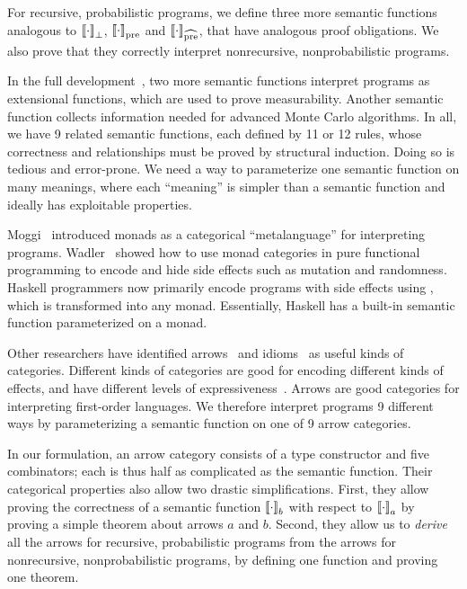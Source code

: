 \documentclass{llncs}
\newcommand{\todo}[1]{}
\newcommand{\gen}{_a}
\newcommand{\genb}{_b}
\newcommand{\pre}{_\mathrm{pre}}
\newcommand{\prehat}{_\mathrm{\widehat{pre}}}
\begin{document}
For recursive, probabilistic programs, we define three more semantic functions analogous to $\left\llbracket{\cdot}\right\rrbracket_\bot$, $\meaningof{\cdot}\pre$ and $\meaningof{\cdot}\prehat$, that have analogous proof obligations.
We also prove that they correctly interpret nonrecursive, nonprobabilistic programs.

In the full development~\cite{cit:toronto-thesis}, two more semantic functions interpret programs as extensional functions, which are used to prove measurability.
Another semantic function collects information needed for advanced Monte Carlo algorithms.
In all, we have 9 related semantic functions, each defined by 11 or 12 rules, whose correctness and relationships must be proved by structural induction.
Doing so is tedious and error-prone.
We need a way to parameterize one semantic function on many meanings, where each ``meaning'' is simpler than a semantic function and ideally has exploitable properties.

Moggi~\cite{cit:moggi-1989lics-monads} introduced monads as a categorical ``metalanguage'' for interpreting programs.
Wadler~\cite{cit:wadler-2001-monads} showed how to use monad categories in pure functional programming to encode and hide side effects such as mutation and randomness.
Haskell programmers now primarily encode programs with side effects using , which is transformed into any monad.
Essentially, Haskell has a built-in semantic function parameterized on a monad.

Other researchers have identified arrows~\cite{cit:hughes-2000scp-arrows} and idioms~\cite{cit:mcbride-2008jfp-idiom} as useful kinds of categories.
Different kinds of categories are good for encoding different kinds of effects, and have different levels of expressiveness~\cite{cit:lindley-2008entcs-idiom-arrow-monad}.
Arrows are good categories for interpreting first-order languages.
We therefore interpret programs 9 different ways by parameterizing a semantic function on one of 9 arrow categories.

\todo{David: It might be worth giving a graphical figure presenting these semantics and the relations between them. I have a hard time seeing why you need so many variations.}

In our formulation, an arrow category consists of a type constructor and five combinators; each is thus half as complicated as the semantic function.
Their categorical properties also allow two drastic simplifications.
First, they allow proving the correctness of a semantic function $\meaningof{\cdot}\genb$ with respect to $\meaningof{\cdot}\gen$ by proving a simple theorem about arrows $a$ and $b$.
Second, they allow us to \emph{derive} all the arrows for recursive, probabilistic programs from the arrows for nonrecursive, nonprobabilistic programs, by defining one function and proving one theorem.
\end{document}
